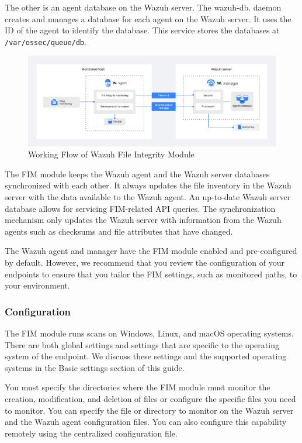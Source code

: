 The other is an agent database on the Wazuh server. The wazuh-db. daemon creates and manages a database for each agent on the Wazuh server. It uses the ID of the agent to identify the database. This service stores the databases at \texttt{/var/ossec/queue/db}.

\begin{figure} [H]
    \centering
    \includegraphics[width=\textwidth]{images/fim/fim-flow.png}
    \caption{Working Flow of Wazuh File Integrity Module}
    \label{fig:fim-flow}
\end{figure}

The FIM module keeps the Wazuh agent and the Wazuh server databases synchronized with each other. It always updates the file inventory in the Wazuh server with the data available to the Wazuh agent. An up-to-date Wazuh server database allows for servicing FIM-related API queries. The synchronization mechanism only updates the Wazuh server with information from the Wazuh agents such as checksums and file attributes that have changed.

The Wazuh agent and manager have the FIM module enabled and pre-configured by default. However, we recommend that you review the configuration of your endpoints to ensure that you tailor the FIM settings, such as monitored paths, to your environment.

\subsubsection{Configuration}
The FIM module runs scans on Windows, Linux, and macOS operating systems. There are both global settings and settings that are specific to the operating system of the endpoint. We discuss these settings and the supported operating systems in the Basic settings section of this guide.

You must specify the directories where the FIM module must monitor the creation, modification, and deletion of files or configure the specific files you need to monitor. You can specify the file or directory to monitor on the Wazuh server and the Wazuh agent configuration files. You can also configure this capability remotely using the centralized configuration file.


